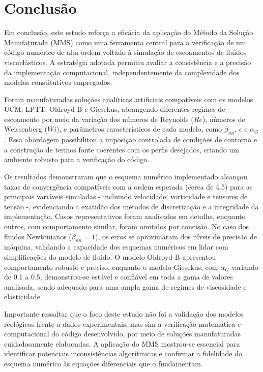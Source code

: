\chapter[Conclusão]{Conclusão}
\label{Cap_Conclusao}

Em conclusão, este estudo reforça a eficácia da aplicação do Método da Solução Manufaturada (MMS) como uma ferramenta central para a verificação de um código numérico de alta ordem voltado à simulação de escoamentos de fluidos viscoelásticos. A estratégia adotada permitiu avaliar a consistência e a precisão da implementação computacional, independentemente da complexidade dos modelos constitutivos empregados.

Foram manufaturadas soluções analíticas artificiais compatíveis com os modelos UCM, LPTT, Oldroyd-B e Giesekus, abrangendo diferentes regimes de escoamento por meio da variação dos números de Reynolds ($Re$), números de Weissenberg ($Wi$), e parâmetros característicos de cada modelo, como $\beta_{nn}$, $\epsilon$ e $\alpha_G$. Essa abordagem possibilitou a imposição controlada de condições de contorno e a construção de termos fonte coerentes com os perfis desejados, criando um ambiente robusto para a verificação do código.

Os resultados demonstraram que o esquema numérico implementado alcançou taxas de convergência compatíveis com a ordem esperada (cerca de 4.5) para as principais variáveis simuladas - incluindo velocidade, vorticidade e tensores de tensão -, evidenciando a exatidão dos métodos de discretização e a integridade da implementação. Casos representativos foram analisados em detalhe, enquanto outros, com comportamento similar, foram omitidos por concisão. No caso dos fluidos Newtonianos ($\beta_{nn}=1$), os erros se aproximaram dos níveis de precisão de máquina, validando a capacidade dos esquemas numéricos em lidar com simplificações do modelo de fluido. O modelo Oldroyd-B apresentou comportamento robusto e preciso, enquanto o modelo Giesekus, com $\alpha_G$ variando de 0.1 a 0.5, demonstrou-se estável e confiável em toda a gama de valores analisada, sendo adequado para uma ampla gama de regimes de viscosidade e elasticidade.

Importante ressaltar que o foco deste estudo não foi a validação dos modelos reológicos frente a dados experimentais, mas sim a verificação matemática e computacional do código desenvolvido, por meio de soluções manufaturadas cuidadosamente elaboradas. A aplicação do MMS mostrou-se essencial para identificar potenciais inconsistências algorítmicas e confirmar a fidelidade do esquema numérico às equações diferenciais que o fundamentam.

